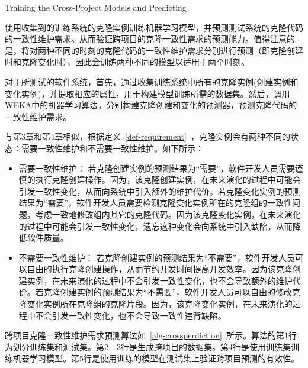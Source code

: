 
{Training the Cross-Project Models and Predicting}

使用收集到的训练系统的克隆实例训练机器学习模型，并预测测试系统的克隆代码的一致性维护需求。从而验证跨项目的克隆一致性需求的预测能力。值得注意的是，将对两种不同的时刻的克隆代码的一致性维护需求分别进行预测（即克隆创建时和克隆变化时），因此会训练两种不同的模型以适用于两个时刻。

对于所测试的软件系统，首先，通过收集训练系统中所有的克隆实例(创建实例和变化实例)，并提取相应的属性，用于构建模型训练所需的数据集。然后，调用WEKA中的机器学习算法，分别构建克隆创建和变化的预测器，预测克隆代码的一致性维护需求。

与第3章和第4章相似，根据定义~\ref{def-requirement}~，克隆实例会有两种不同的状态：需要一致性维护和不需要一致性维护。如下所示：

\begin{itemize}
\item 
需要一致性维护：
若克隆创建实例的预测结果为“需要”，软件开发人员需要谨慎的执行克隆创建操作。因为，该克隆创建实例，在未来演化的过程中可能会引发一致性变化，从而向系统中引入额外的维护代价。若克隆变化实例的预测结果为“需要”，软件开发人员需要检测克隆变化实例所在的克隆组的一致性问题，考虑一致地修改组内其它的克隆代码。因为该克隆变化实例，在未来演化的过程中可能会引发一致性变化，遗忘这种变化会向系统中引入缺陷，从而降低软件质量。
\item
不需要一致性维护：
若克隆创建实例的预测结果为“不需要”，软件开发人员可以自由的执行克隆创建操作，从而节约开发时间提高开发效率。因为该克隆创建实例，在未来演化的过程中不会引发一致性变化，也不会导致额外的维护代价。若克隆创建实例的预测结果为“不需要”，软件开发人员可以自由的修改克隆变化实例所在克隆组的克隆片段。因为，该克隆变化实例，在未来演化的过程中不会引发一致性变化，也不会导致一致性违背缺陷。
\end{itemize}

跨项目克隆一致性维护需求预测算法如~\ref{alg-crossperdiction}~所示。算法的第1行为划分训练集和测试集。第2 - 3行是生成跨项目的数据集。第4行是使用训练集训练机器学习模型。第5行是使用训练的模型在测试集上验证跨项目预测的有效性。

